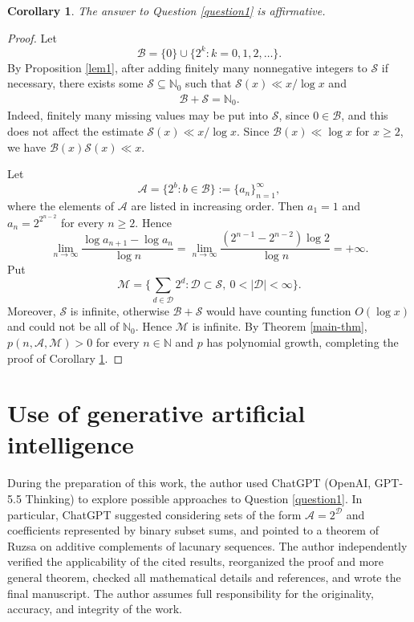 \documentclass[12pt,a4paper,reqno]{amsart}
\numberwithin{equation}{section}
\def\N{{\mathbb N}}
\theoremstyle{plain}
\newtheorem{corollary}{Corollary}
\theoremstyle{definition}
\begin{document}
\begin{corollary}\label{corollary}
The answer to Question \ref{question1} is affirmative.
\end{corollary}
\begin{proof}
Let
$$
\mathcal{B}=\{0\}\cup\big\{2^k: k=0,1,2,\ldots\big\}.
$$
By Proposition \ref{lem1}, after adding finitely many nonnegative integers to $\mathcal{S}$ if necessary, there exists some $\mathcal{S}\subseteq \N_0$ such that $\mathcal{S}(x)\ll x/\log x$ and
\begin{align*}
\mathcal{B}+\mathcal{S}=\mathbb{N}_0.
\end{align*}
Indeed, finitely many missing values may be put into $\mathcal{S}$, since $0\in\mathcal{B}$, and this does not affect the estimate $\mathcal{S}(x)\ll x/\log x$. Since $\mathcal{B}(x)\ll\log x$ for $x\ge 2$, we have $\mathcal{B}(x)\mathcal{S}(x)\ll x$.

Let
$$
\mathcal{A}=\big\{2^b: b\in \mathcal{B}\big\}:=\{a_n\}_{n=1}^{\infty},
$$
where the elements of $\mathcal{A}$ are listed in increasing order. Then $a_1=1$ and $a_n=2^{2^{n-2}}$ for every $n\ge 2$. Hence
$$
\lim_{n\to\infty}\frac{\log a_{n+1}-\log a_n}{\log n}
=\lim_{n\to\infty}\frac{(2^{n-1}-2^{n-2})\log 2}{\log n}=+\infty.
$$
Put
$$
\mathcal{M}=\bigg\{\sum_{d\in \mathcal{D}} 2^{d}: \mathcal{D}\subset \mathcal{S},\ 0<|\mathcal{D}|<\infty\bigg\}.
$$
Moreover, $\mathcal{S}$ is infinite, otherwise $\mathcal{B}+\mathcal{S}$ would have counting function $O(\log x)$ and could not be all of $\N_0$. Hence $\mathcal{M}$ is infinite. By Theorem \ref{main-thm}, $p(n, \mathcal{A}, \mathcal{M})>0$ for every $n\in\N$ and $p$ has polynomial growth, completing the proof of Corollary \ref{corollary}.
\end{proof}

\section*{Use of generative artificial intelligence}

During the preparation of this work, the author used ChatGPT (OpenAI, GPT-5.5 Thinking) to explore possible approaches to Question \ref{question1}. In particular, ChatGPT suggested considering sets of the form $\mathcal{A}=2^{\mathcal{D}}$ and coefficients represented by binary subset sums, and pointed to a theorem of Ruzsa on additive complements of lacunary sequences. The author independently verified the applicability of the cited results, reorganized the proof and more general theorem, checked all mathematical details and references, and wrote the final manuscript. The author assumes full responsibility for the originality, accuracy, and integrity of the work.
\end{document}
